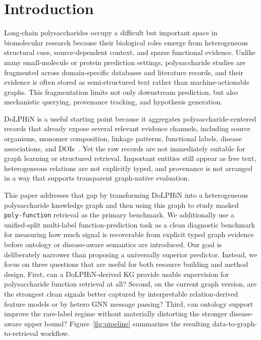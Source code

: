 \documentclass[11pt]{article}
\begin{document}
\section{Introduction}
\label{sec:introduction}

Long-chain polysaccharides occupy a difficult but important space in biomolecular research because their biological roles emerge from heterogeneous structural cues, source-dependent context, and sparse functional evidence. Unlike many small-molecule or protein prediction settings, polysaccharide studies are fragmented across domain-specific databases and literature records, and their evidence is often stored as semi-structured text rather than machine-actionable graphs. This fragmentation limits not only downstream prediction, but also mechanistic querying, provenance tracking, and hypothesis generation.

DoLPHiN is a useful starting point because it aggregates polysaccharide-centered records that already expose several relevant evidence channels, including source organisms, monomer composition, linkage patterns, functional labels, disease associations, and DOIs~\cite{xin2025dolphin}. Yet the raw records are not immediately suitable for graph learning or structured retrieval. Important entities still appear as free text, heterogeneous relations are not explicitly typed, and provenance is not arranged in a way that supports transparent graph-native evaluation.

This paper addresses that gap by transforming DoLPHiN into a heterogeneous polysaccharide knowledge graph and then using this graph to study masked \texttt{poly-function} retrieval as the primary benchmark. We additionally use a unified-split multi-label function-prediction task as a clean diagnostic benchmark for measuring how much signal is recoverable from explicit typed graph evidence before ontology or disease-aware semantics are introduced. Our goal is deliberately narrower than proposing a universally superior predictor. Instead, we focus on three questions that are useful for both resource building and method design. First, can a DoLPHiN-derived KG provide usable supervision for polysaccharide function retrieval at all? Second, on the current graph version, are the strongest clean signals better captured by interpretable relation-derived feature models or by hetero GNN message passing? Third, can ontology support improve the rare-label regime without materially distorting the stronger disease-aware upper bound? Figure~\ref{fig:pipeline} summarizes the resulting data-to-graph-to-retrieval workflow.
\end{document}
